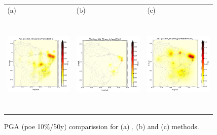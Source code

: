 \documentclass[grl]{agutex}
\begin{document}
\begin{figure}
	\begin{center}
	\begin{table}[H]
		\begin{tabular}{ p{}
						 p{}
						 p{} }
		\footnotesize(a) &
		\footnotesize(b) &
		\footnotesize(c)
		\\
		\includegraphics[height=5cm]{z_img_pga_frankel}  &
		\includegraphics[height=5cm]{z_img_pga_woo} &
		\includegraphics[height=5cm]{z_img_pga_helmstetter}
		\end{tabular}
	\end{table}
	\caption{PGA (poe 10\%/50y) comparission for (a) \citet{frankel_1995}, (b) \citet{woo_1996} and (c) \citet{helmstetter_2012} methods.}
	\label{fig_pga}
	\end{center}
\end{figure}
\end{document}
